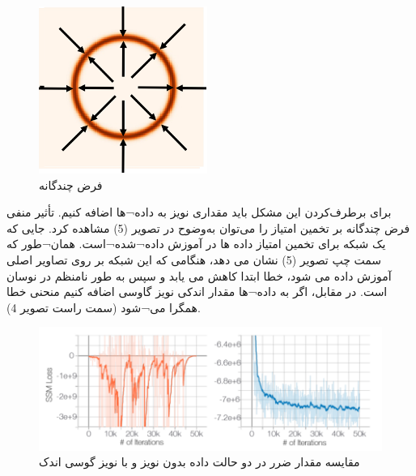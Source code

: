 \documentclass[12pt]{article}
\begin{document}
\begin{enumerate}
\begin{enumerate}
{\begin{figure}[h]
            \includegraphics[width=\textwidth]{figs/Q1_2_1.png}
            \caption{فرض چندگانه}
            \label{fig:q1_2_1}  
        \end{figure}
        برای برطرف‌کردن این مشکل باید مقداری نویز به داده¬ها اضافه کنیم. تأثیر منفی فرض چندگانه بر تخمین امتیاز را می‌توان به‌وضوح در تصویر (5) مشاهده کرد. جایی که یک شبکه  برای تخمین امتیاز داده ها در  آموزش داده¬شده¬است. همان¬طور که سمت چپ تصویر (5) نشان می دهد، هنگامی که این شبکه بر روی تصاویر اصلی  آموزش داده می شود، خطا ابتدا کاهش می یابد و سپس به طور نامنظم در نوسان است. در مقابل، اگر به داده¬ها مقدار اندکی نویز گاوسی اضافه کنیم منحنی خطا همگرا می¬شود (سمت راست تصویر 4).
        \begin{figure}[h]
            \centering
            \includegraphics[width=\textwidth]{figs/Q1_2_2.png}
            \caption{مقایسه مقدار ضرر در دو حالت داده بدون نویز و با نویز گوسی اندک}

\end{figure}}
\end{enumerate}
\end{enumerate}
\end{document}

